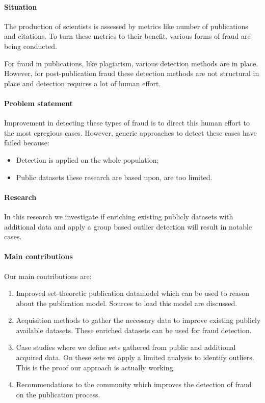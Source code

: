 \documentclass{ou-report}
\begin{document}
\paragraph{Situation}
The production of scientists is assessed by metrics like number of publications 
and citations. To turn these metrics to their benefit, various forms of fraud
are being conducted.

For fraud in publications, like plagiarism, various detection methods are in place. 
However, for post-publication fraud these detection 
methods are not structural in place and detection requires a lot of human effort.

\paragraph{Problem statement}
Improvement in detecting these types of fraud is to direct this human effort to the most
egregious cases. However, generic approaches to detect these cases 
have failed because:
\begin{itemize}
    \item Detection is applied on the whole population;
    \item Public datasets these research are based upon, are too limited.
\end{itemize}

\paragraph{Research}
In this research we investigate if enriching existing publicly datasets with 
additional data and apply a group based outlier detection will result in 
notable cases.

\paragraph{Main contributions}
Our main contributions are:
\begin{enumerate}
    \item Improved set-theoretic publication datamodel which can be used to 
        reason about the publication model. Sources to load this model are 
        discussed.
    \item Acquisition methods to gather the necessary data to improve existing 
        publicly available datasets. These enriched datasets can be used for
        fraud detection.
    \item Case studies where we define sets gathered from public and additional
        acquired data. On these sets we apply a limited analysis to identify 
        outliers. This is the proof our approach is actually working.
    \item Recommendations to the community which improves the detection of 
        fraud on the publication process. 
\end{enumerate}
\end{document}
